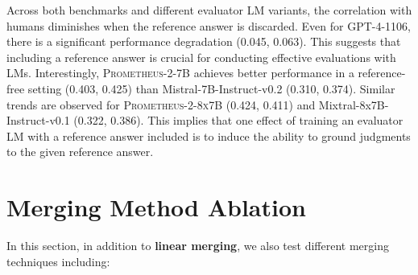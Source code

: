 \documentclass[11pt]{article}
\begin{document}
Across both benchmarks and different evaluator LM variants, the correlation with humans diminishes when the reference answer is discarded. Even for GPT-4-1106, there is a significant performance degradation (0.045, 0.063). This suggests that including a reference answer is crucial for conducting effective evaluations with LMs. Interestingly, \textsc{Prometheus-2-7B} achieves better performance in a reference-free setting (0.403, 0.425) than Mistral-7B-Instruct-v0.2 (0.310, 0.374). Similar trends are observed for \textsc{Prometheus-2-8x7B} (0.424, 0.411) and Mixtral-8x7B-Instruct-v0.1 (0.322, 0.386). This implies that one effect of training an evaluator LM with a reference answer included is to induce the ability to ground judgments to the given reference answer.

\section{Merging Method Ablation}\label{appendix:merging}

In this section, in addition to \textbf{linear merging}, we also test different merging techniques including:
\end{document}

